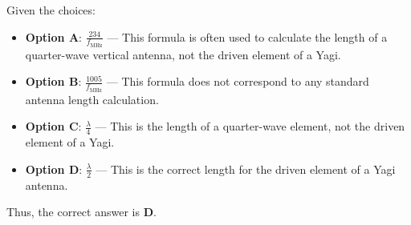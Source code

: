 Given the choices:
\begin{itemize}
    \item \textbf{Option A}: \( \frac{234}{f_{\text{MHz}}} \) — This formula is often used to calculate the length of a quarter-wave vertical antenna, not the driven element of a Yagi.
    \item \textbf{Option B}: \( \frac{1005}{f_{\text{MHz}}} \) — This formula does not correspond to any standard antenna length calculation.
    \item \textbf{Option C}: \( \frac{\lambda}{4} \) — This is the length of a quarter-wave element, not the driven element of a Yagi.
    \item \textbf{Option D}: \( \frac{\lambda}{2} \) — This is the correct length for the driven element of a Yagi antenna.
\end{itemize}

Thus, the correct answer is \textbf{D}.

